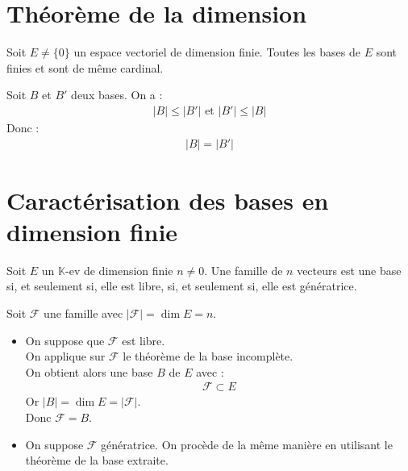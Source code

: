 \documentclass[../main.tex]{subfiles}
\begin{document}
\section{Théorème de la dimension}
\begin{tcolorbox}[title=Théorème 22.12, title filled=false, colframe=orange, colback=orange!10!white]
    Soit $E \neq \{0\}$ un espace vectoriel de dimension finie. Toutes les bases de $E$ sont finies et sont de même cardinal. 
\end{tcolorbox}

\noindent Soit $B$ et $B'$ deux bases. On a : 
\begin{align*}
    |B| \leq |B'| \text{ et } |B'| \leq |B|
\end{align*}
Donc : 
\begin{align*}
    |B| = |B'|
\end{align*}

\section{Caractérisation des bases en dimension finie}
\begin{tcolorbox}[title=Théorème 22.18, title filled=false, colframe=orange, colback=orange!10!white]
    Soit $E$ un $\mathbb{K}$-ev de dimension finie $n\neq 0$. Une famille de $n$ vecteurs est une base si, et seulement si, elle est libre, si, et seulement si, elle est génératrice.
\end{tcolorbox}

\noindent Soit $\mathcal{F}$ une famille avec $|\mathcal{F}| = \dim E = n$. \\
\begin{itemize}
    \item On suppose que $\mathcal{F}$ est libre. \\
    On applique sur $\mathcal{F}$ le théorème de la base incomplète. \\
    On obtient alors une base $B$ de $E$ avec : 
    \begin{align*}
        \mathcal{F} \subset E
    \end{align*}
    Or $|B| = \dim E = |\mathcal{F}|$. \\
    Donc $\mathcal{F} = B$. 

    \item On suppose $\mathcal{F}$ génératrice. On procède de la même manière en utilisant le théorème de la base extraite. 
\end{itemize}
\end{document}
